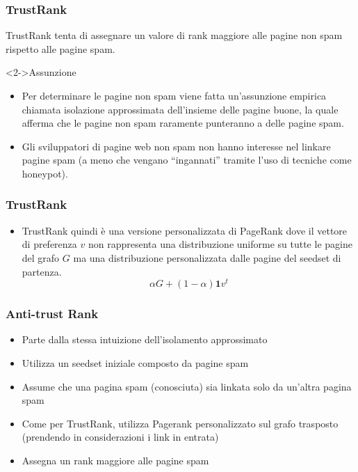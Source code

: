 \documentclass{beamer}
\begin{document}
\begin{frame}
  \frametitle{TrustRank}
  TrustRank tenta di assegnare un valore di rank maggiore alle pagine non spam rispetto alle pagine spam.
  \begin{block}<2->{Assunzione}
  \begin{itemize}
   \item Per determinare le pagine non spam viene fatta un’assunzione empirica chiamata isolazione approssimata dell’insieme delle pagine buone, la quale afferma che le pagine non spam raramente punteranno a delle pagine spam.
   \item Gli sviluppatori di pagine web non spam non hanno interesse nel linkare pagine spam (a meno che vengano “ingannati” tramite l’uso di tecniche come honeypot).
  \end{itemize}
  \end{block}
\end{frame}
\begin{frame}
  \frametitle{TrustRank}
  \begin{itemize}
   \item   TrustRank quindi è una versione personalizzata di PageRank dove il vettore di preferenza \(v\) non rappresenta una distribuzione uniforme su tutte le pagine del grafo \(G\) ma una distribuzione personalizzata dalle pagine del seedset di partenza.
$$
   \alpha G + (1-\alpha)\textbf{1}v^t
$$
  \end{itemize}
\end{frame}
\begin{frame}
  \frametitle{Anti-trust Rank}
  \begin{itemize}
   \item Parte dalla stessa intuizione dell'isolamento approssimato
   \item Utilizza un seedset iniziale composto da pagine spam
   \item Assume che una pagina spam (conosciuta) sia linkata solo da un'altra pagina spam 
   \item Come per TrustRank, utilizza Pagerank personalizzato sul grafo trasposto (prendendo in considerazioni i link in entrata)
   \item Assegna un rank maggiore alle pagine spam
  \end{itemize}
\end{frame}
\end{document}
